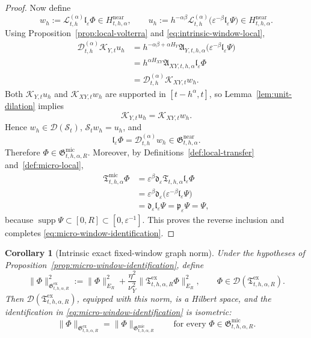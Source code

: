 \documentclass[11pt,a4paper]{amsart}
\theoremstyle{plain}
\newtheorem{corollary}[theorem]{Corollary}
\theoremstyle{definition}
\theoremstyle{remark}
\begin{document}
\begin{proof}
Now define
\[
w_h:=\mathcal L_{t,h}^{(\alpha)}\mathfrak l_{\varepsilon}\Phi
\in H_{t,h,\alpha}^{\mathrm{near}},
\qquad
u_h:=
h^{-\alpha\beta}
\mathcal L_{t,h}^{(\alpha)}
\bigl(
\varepsilon^{-\beta}\mathfrak l_{\varepsilon}\Psi
\bigr)
\in H_{t,h,\alpha}^{\mathrm{near}}.
\]
Using Proposition~\ref{prop:local-volterra} and \eqref{eq:intrinsic-window-local},
\begin{align*}
\mathcal D_{t,h}^{(\alpha)}\mathcal K_{Y,t}u_h
&=
h^{-\alpha\beta+\alpha H_Y}
\mathfrak A_{Y,t,h,\alpha}
\bigl(
\varepsilon^{-\beta}\mathfrak l_{\varepsilon}\Psi
\bigr) \\
&=
h^{\alpha H_{XY}}
\mathfrak A_{XY,t,h,\alpha}\mathfrak l_{\varepsilon}\Phi \\
&=
\mathcal D_{t,h}^{(\alpha)}\mathcal K_{XY,t}w_h.
\end{align*}
Both \(\mathcal K_{Y,t}u_h\) and \(\mathcal K_{XY,t}w_h\) are supported in
\([t-h^\alpha,t]\), so Lemma~\ref{lem:unit-dilation} implies
\[
\mathcal K_{Y,t}u_h=\mathcal K_{XY,t}w_h.
\]
Hence \(w_h\in\mathcal D(\mathcal S_t)\), \(\mathcal S_t w_h=u_h\), and
\[
\mathfrak l_{\varepsilon}\Phi
=
\mathcal D_{t,h}^{(\alpha)}w_h
\in
\mathfrak G_{t,h,\alpha}^{\mathrm{near}}.
\]
Therefore \(\Phi\in\mathfrak G_{t,h,\alpha,R}^{\mathrm{mic}}\). Moreover, by
Definitions~\ref{def:local-transfer} and~\ref{def:micro-local},
\begin{align*}
\mathfrak T_{t,h,\alpha}^{\mathrm{mic}}\Phi
&=
\varepsilon^\beta
\mathfrak d_{\varepsilon}
\mathfrak T_{t,h,\alpha}\mathfrak l_{\varepsilon}\Phi \\
&=
\varepsilon^\beta
\mathfrak d_{\varepsilon}
\bigl(
\varepsilon^{-\beta}\mathfrak l_{\varepsilon}\Psi
\bigr) \\
&=
\mathfrak d_{\varepsilon}\mathfrak l_{\varepsilon}\Psi
=
\mathfrak p_{\varepsilon}\Psi
=
\Psi,
\end{align*}
because \(\operatorname{supp}\Psi\subset [0,R]\subset [0,\varepsilon^{-1}]\). This proves the
reverse inclusion and completes \eqref{eq:micro-window-identification}.
\end{proof}

\begin{corollary}[Intrinsic exact fixed-window graph norm]
\label{cor:micro-window-exact-norm}
Under the hypotheses of Proposition~\ref{prop:micro-window-identification}, define
\[
\|\Phi\|_{\mathfrak G_{t,h,\alpha,R}^{\mathrm{ex}}}^2
:=
\|\Phi\|_{E_R}^2
+
\frac{\eta^2}{\nu_Y^2}
\|\mathfrak T_{t,h,\alpha,R}^{\mathrm{ex}}\Phi\|_{E_R}^2,
\qquad
\Phi\in\mathcal D(\mathfrak T_{t,h,\alpha,R}^{\mathrm{ex}}).
\]
Then \(\mathcal D(\mathfrak T_{t,h,\alpha,R}^{\mathrm{ex}})\), equipped with this norm, is a
Hilbert space, and the identification in \eqref{eq:micro-window-identification} is isometric:
\[
\|\Phi\|_{\mathfrak G_{t,h,\alpha,R}^{\mathrm{ex}}}
=
\|\Phi\|_{\mathfrak G_{t,h,\alpha,R}^{\mathrm{mic}}}
\qquad\text{for every }\Phi\in\mathfrak G_{t,h,\alpha,R}^{\mathrm{mic}}.
\]
\end{corollary}
\end{document}
